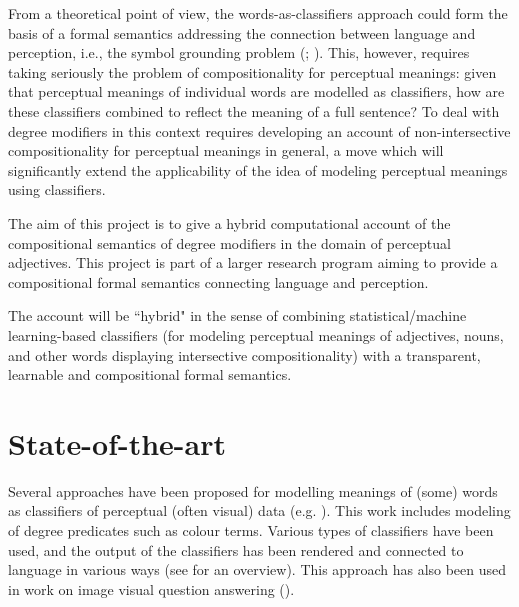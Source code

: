 \documentclass[11pt,a4paper]{article}
\newcommand{\instruction}[1]{}
\begin{document}
From a theoretical point of view, the words-as-classifiers approach could form the basis of a formal semantics addressing the connection between language and perception, i.e., the symbol grounding problem (; ). This, however, requires taking seriously the problem of compositionality for perceptual meanings: given that perceptual meanings of individual words are modelled as classifiers, how are these classifiers combined to reflect the meaning of a full sentence? To deal with degree modifiers in this context requires developing an account of non-intersective compositionality for perceptual meanings in general, a move which will significantly extend the applicability of the idea of modeling perceptual meanings using  classifiers.

The aim of this project is to give a hybrid computational account of the compositional semantics of degree modifiers in the domain of perceptual adjectives. This project is part of a larger research program aiming to provide a compositional formal semantics connecting language and perception.%

 The account will be ``hybrid" in the sense of combining %
statistical/machine learning-based classifiers (for modeling perceptual meanings of adjectives, nouns, and other words displaying intersective compositionality) with a transparent, learnable and compositional 
formal semantics.
\vspace{-2ex}
\section{State-of-the-art}
\vspace{-2ex}
\instruction{Summarise briefly the current research frontier within the field/area covered by the project. State key references.}


Several approaches have been proposed for modelling meanings of (some) words as classifiers of perceptual (often visual) data (e.g. ). This work includes modeling of degree predicates such as colour terms. Various types of classifiers have been used, and the output of the classifiers has been rendered and connected to language in various ways (see \cite{larsson2017compositionality}\/ for an overview). This approach has also been used in work on image visual question answering (). 
\end{document}
